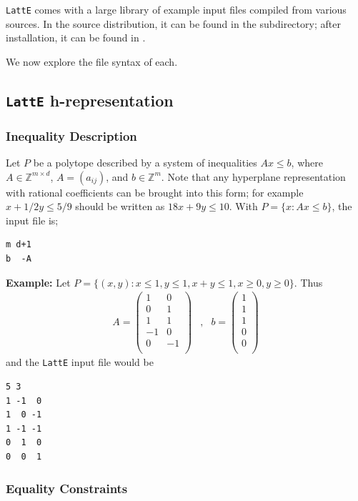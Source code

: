 \documentclass{article}
\newcommand{\Z}{{\mathbb Z}}
\newcommand{\latte}{{\tt LattE}\xspace}
\newcommand{\example}{{\bf Example:\space}}
\begin{document}
\latte comes with a large library of example input files compiled from various
sources.  In the source distribution, it can be found in the  subdirectory;
after installation, it can be found in . 

We now explore the file syntax of each.

\subsection{\latte h-representation}

\subsubsection{Inequality Description}
Let $P$ be a polytope described by a
system of inequalities $Ax\leq b$, where $A\in\Z^{m\times d}$, 
$A=(a_{ij})$, and $b\in\Z^m$. Note that any hyperplane representation with rational coefficients can be brought into this form; for example $x + 1/2y \leq 5/9$ should be written as $18x +9y \leq 10$. With $P=\{x : Ax \leq b\}$, the input file is;
\begin{verbatim}
m d+1
b  -A
\end{verbatim}

\example
Let $P=\{(x,y): x\leq 1, y\leq 1, x+y\leq 1, x\geq 0, y\geq 0\}$.
Thus
\[
\begin{array}{ccc}
A=\left(
\begin{array}{rr} 
 1 &  0 \\ 
 0 &  1 \\ 
 1 &  1 \\
-1 &  0 \\ 
 0 & -1 \\ 
\end{array} 
\right) 
& , &
b = \left( 
\begin{array}{r} 
1 \\ 
1 \\ 
1 \\ 
0 \\
0 \\ 
\end{array} 
\right)
\end{array}
\]
and the {\tt LattE} input file would be
\begin{verbatim}
5 3
1 -1  0
1  0 -1
1 -1 -1
0  1  0
0  0  1
\end{verbatim}

\subsubsection{Equality Constraints}
\end{document}
